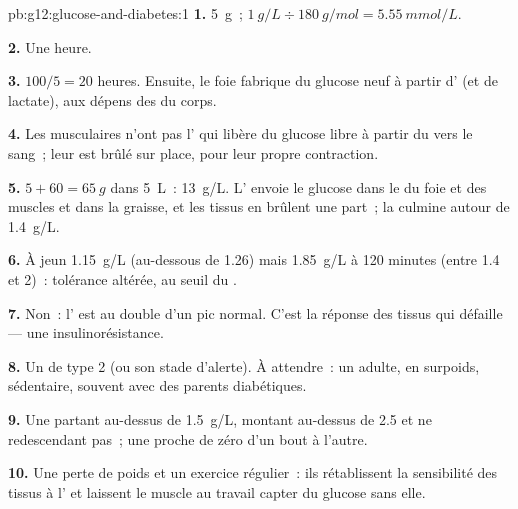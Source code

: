 \begin{solution}{pb:g12:glucose-and-diabetes:1}
\textbf{1.} \qty{5}{g}~; $\qty{1}{g/L} \div \qty{180}{g/mol} = \qty{5.55}{mmol/L}$.

\textbf{2.} Une heure.

\textbf{3.} $100/5 = 20$ heures. Ensuite, le foie fabrique du glucose
neuf à partir d' (et de lactate), aux dépens des
 du corps.

\textbf{4.} Les  musculaires n'ont pas l' qui libère du
glucose libre à partir du  vers le sang~; leur  est
brûlé sur place, pour leur propre contraction.

\textbf{5.} $5 + 60 = \qty{65}{g}$ dans \qty{5}{L}~: \qty{13}{g/L}.
L' envoie le glucose dans le  du foie et des muscles
et dans la graisse, et les tissus en brûlent une part~; la 
culmine autour de \qty{1.4}{g/L}.

\textbf{6.} À jeun \qty{1.15}{g/L} (au-dessous de 1.26) mais
\qty{1.85}{g/L} à 120 minutes (entre 1.4 et 2)~: tolérance altérée, au
seuil du .

\textbf{7.} Non~: l' est au double d'un pic normal. C'est la
réponse des tissus qui défaille --- une insulinorésistance.

\textbf{8.} Un  de type 2 (ou son stade d'alerte). À
attendre~: un adulte, en surpoids, sédentaire, souvent avec des
parents diabétiques.

\textbf{9.} Une  partant au-dessus de \qty{1.5}{g/L}, montant
au-dessus de \num{2.5} et ne redescendant pas~; une  proche de
zéro d'un bout à l'autre.

\textbf{10.} Une perte de poids et un exercice régulier~: ils
rétablissent la sensibilité des tissus à l' et laissent le
muscle au travail capter du glucose sans elle.


\end{solution}
